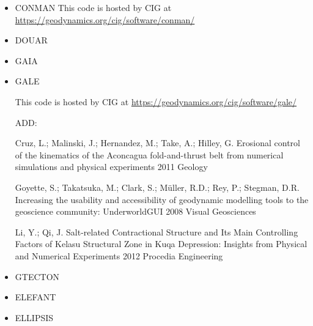 \begin{itemize}


\item CONMAN
This code is hosted by CIG at \url{https://geodynamics.org/cig/software/conman/}

\cite{kirh90}
\cite{itki94}
\cite{kian95}
\cite{kian98}
\cite{itki98}
\cite{befo99}
\cite{kifr15}


\item DOUAR

\cite{brtf08}
\cite{thfb08}
\cite{yahb09}
\cite{brya09}
\cite{lobh10}
\cite{mutg13}
\cite{whbb14}
\cite{neew18}


\item GAIA

\item GALE

This code is hosted by CIG at \url{https://geodynamics.org/cig/software/gale/}

\cite{fabs08}
\cite{beve10}
\cite{cmwt10}
\cite{lehm12}
\cite{arbi13}

ADD:


Cruz, L.; Malinski, J.; Hernandez, M.; Take, A.; Hilley, G. 	Erosional control of the kinematics of the Aconcagua fold-and-thrust belt from numerical simulations and physical experiments 	2011 	Geology

	
Goyette, S.; Takatsuka, M.; Clark, S.; Müller, R.D.; Rey, P.; Stegman, D.R. 	Increasing the usability and accessibility of geodynamic modelling tools to the geoscience community: UnderworldGUI 	2008 	Visual Geosciences
	
Li, Y.; Qi, J. 	Salt-related Contractional Structure and Its Main Controlling Factors of Kelasu Structural Zone in Kuqa Depression: Insights from Physical and Numerical Experiments 	2012 	Procedia Engineering






\item GTECTON
\cite{gowo95}
\cite{gowo99}
\cite{bugw01}
\cite{bugw02}
\cite{gowo05}
\cite{degw06}
\cite{libi06}
\cite{bagw11}
\cite{bagw11b}
\cite{mags15}




\item ELEFANT

\cite{tosn15}
\cite{matv15}
\cite{busa16}
\cite{latb17}
\cite{thie17}
\cite{pltv18}

\item ELLIPSIS


\end{itemize}
